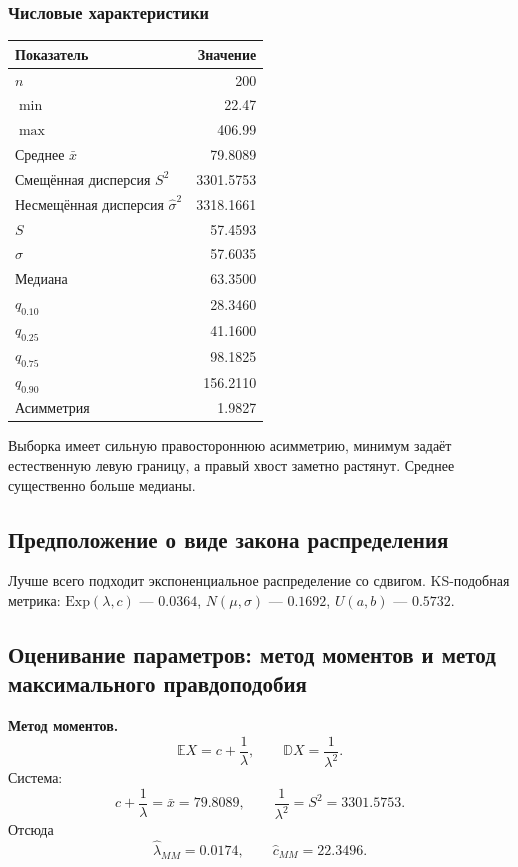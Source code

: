 \documentclass[12pt,a4paper]{article}
\begin{document}
\subsubsection*{Числовые характеристики}

\begin{center}
\begin{tabular}{>{\raggedright\arraybackslash}p{}r}
\toprule
Показатель & Значение \\
\midrule
$n$ & 200 \\
$\min$ & 22.47 \\
$\max$ & 406.99 \\
Среднее $\bar{x}$ & 79.8089 \\
Смещённая дисперсия $S^2$ & 3301.5753 \\
Несмещённая дисперсия $\hat{\sigma}^2$ & 3318.1661 \\
$S$ & 57.4593 \\
$\hat{\sigma}$ & 57.6035 \\
Медиана & 63.3500 \\
$q_{0.10}$ & 28.3460 \\
$q_{0.25}$ & 41.1600 \\
$q_{0.75}$ & 98.1825 \\
$q_{0.90}$ & 156.2110 \\
Асимметрия & 1.9827 \\
\bottomrule
\end{tabular}
\end{center}

Выборка имеет сильную правостороннюю асимметрию, минимум задаёт естественную левую границу, а правый хвост заметно растянут. Среднее существенно больше медианы.

\subsection{Предположение о виде закона распределения}

Лучше всего подходит экспоненциальное распределение со сдвигом. KS-подобная метрика: $\mathrm{Exp}(\lambda,c)$ --- $0.0364$, $N(\mu,\sigma)$ --- $0.1692$, $U(a,b)$ --- $0.5732$.

\subsection{Оценивание параметров: метод моментов и метод максимального правдоподобия}

\textbf{Метод моментов.}
\[
\mathbb{E}X = c + \frac{1}{\lambda}, \qquad \mathbb{D}X = \frac{1}{\lambda^2}.
\]
Система:
\[
c + \frac{1}{\lambda} = \bar{x} = 79.8089, \qquad \frac{1}{\lambda^2} = S^2 = 3301.5753.
\]
Отсюда
\[
\hat{\lambda}_{MM} = 0.0174, \qquad \hat{c}_{MM} = 22.3496.
\]
\end{document}
